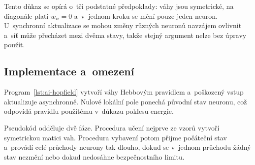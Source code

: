 Tento důkaz se opírá o~tři podstatné předpoklady: váhy jsou symetrické, na diagonále platí \(w_{ii}=0\) a~v~jednom kroku se mění pouze jeden neuron. U~synchronní aktualizace se mohou změny různých neuronů navzájem ovlivnit a~síť může přecházet mezi dvěma stavy, takže stejný argument nelze bez úpravy použít.

\begin{center}
    \centering
    
    \label{fig:ai-hopfield-energie}
\end{center}

\subsection{Implementace a~omezení}

Program~\ref{lst:ai-hopfield} vytvoří váhy Hebbovým pravidlem a~poškozený vstup aktualizuje asynchronně. Nulové lokální pole ponechá původní stav neuronu, což odpovídá pravidlu použitému v~důkazu poklesu energie.

Pseudokód odděluje dvě fáze. Procedura učení nejprve ze vzorů vytvoří symetrickou matici vah. Procedura vybavení potom přijme počáteční stav a~provádí celé průchody neurony tak dlouho, dokud se v~jednom průchodu žádný stav nezmění nebo dokud nedosáhne bezpečnostního limitu.

\begin{algorithm}
    \caption{\textsc{hopfield-recall}}
    \label{alg:ai-hopfield}
\end{algorithm}

